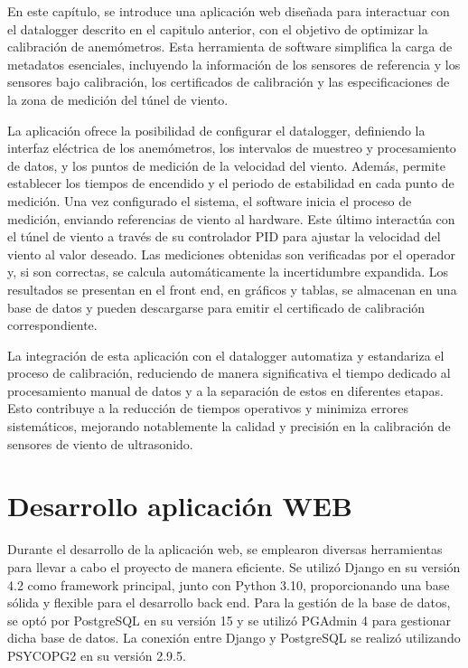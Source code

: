 En este capítulo, se introduce una aplicación web diseñada para interactuar con el datalogger descrito en el capitulo anterior, con el objetivo de optimizar la calibración de anemómetros. Esta herramienta de software simplifica la carga de metadatos esenciales, incluyendo la información de los sensores de referencia y los sensores bajo calibración, los certificados de calibración y las especificaciones de la zona de medición del túnel de viento.

La aplicación ofrece la posibilidad de configurar el datalogger, definiendo la interfaz eléctrica de los anemómetros, los intervalos de muestreo y procesamiento de datos, y los puntos de medición de la velocidad del viento. Además, permite establecer los tiempos de encendido y el periodo de estabilidad en cada punto de medición. Una vez configurado el sistema, el software inicia el proceso de medición, enviando referencias de viento al hardware. Este último interactúa con el túnel de viento a través de su controlador PID para ajustar la velocidad del viento al valor deseado. Las mediciones obtenidas son verificadas por el operador y, si son correctas, se calcula automáticamente la incertidumbre expandida. Los resultados se presentan en el front end, en gráficos y tablas, se almacenan en una base de datos y pueden descargarse para emitir el certificado de calibración correspondiente.

La integración de esta aplicación con el datalogger automatiza y estandariza el proceso de calibración, reduciendo de manera significativa el tiempo dedicado al procesamiento manual de datos y a la separación de estos en diferentes etapas. Esto contribuye a la reducción de tiempos operativos y minimiza errores sistemáticos, mejorando notablemente la calidad y precisión en la calibración de sensores de viento de ultrasonido.
\section{Desarrollo aplicación WEB}
Durante el desarrollo de la aplicación web, se emplearon diversas herramientas para llevar a cabo el proyecto de manera eficiente. Se utilizó Django en su versión 4.2 como framework principal, junto con Python 3.10, proporcionando una base sólida y flexible para el desarrollo back end. Para la gestión de la base de datos, se optó por PostgreSQL en su versión 15 y se utilizó PGAdmin 4 para gestionar dicha base de datos. La conexión entre Django y PostgreSQL se realizó utilizando PSYCOPG2 en su versión 2.9.5.

